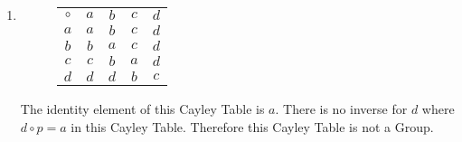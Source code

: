 \documentclass[12pt]{article}
\newlength{\strutheight}
\begin{document}
\begin{enumerate}[label=\textbf{\arabic*}.]
\begin{enumerate}
\begin{adjustbox}{valign=T,raise=\strutheight,minipage={1.0\linewidth}}
			            \begin{wrapfigure}{l}{0pt}
				            \begin{tabular}{c|cccc}
					            $\circ$ & $a$ & $b$ & $c$ & $d$ \\
					            \cline{1-5}
					            $a$     & $a$ & $b$ & $c$ & $d$ \\
					            $b$     & $b$ & $c$ & $d$ & $a$ \\
					            $c$     & $c$ & $d$ & $a$ & $b$ \\
					            $d$     & $d$ & $a$ & $b$ & $c$ \\
				            \end{tabular}
			            \end{wrapfigure}
			            This Cayley Table is the same as the Cayley Table for the group $(\mathbb{Z}_4 , +)$
			            where \(a = 0, \ b = 1, \ c = 2, \ d = 3\), so This Cayley Table must be a group.
		            \end{adjustbox}
		            \\ \\ \\ \\ \\
		      \item \begin{adjustbox}{valign=T,raise=\strutheight,minipage={1.0\linewidth}}
			            \begin{wrapfigure}{l}{0pt}
				            \begin{tabular}{c|cccc}
					            $\circ$ & $a$ & $b$ & $c$ & $d$ \\
					            \cline{1-5}
					            $a$     & $a$ & $b$ & $c$ & $d$ \\
					            $b$     & $b$ & $a$ & $c$ & $d$ \\
					            $c$     & $c$ & $b$ & $a$ & $d$ \\
					            $d$     & $d$ & $d$ & $b$ & $c$ \\
				            \end{tabular}
			            \end{wrapfigure}
			            The identity element of this Cayley Table is $a$.
			            There is no inverse for $d$ where $d \circ p = a$ in this Cayley Table.
			            Therefore this Cayley Table is not a Group.
		            \end{adjustbox}
		            \\ \\ \\ \\ \\

\end{enumerate}
\end{enumerate}
\end{document}
